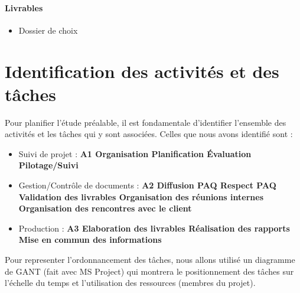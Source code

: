 \paragraph{Livrables}
\begin{itemize}
    \item Dossier de choix
\end{itemize}

\section{Identification des activités et des tâches}

Pour planifier l’étude préalable, il est fondamentale d’identifier l’ensemble des activités et les tâches qui y sont associées. Celles que nous avons identifié sont :
\begin{itemize}
    \item Suivi de projet : \bf{A1}
        \subitem Organisation
        \subitem Planification
        \subitem Évaluation
        \subitem Pilotage/Suivi

    \item Gestion/Contrôle de documents : \bf{A2}
        \subitem Diffusion PAQ
        \subitem Respect PAQ
        \subitem Validation des livrables
        \subitem Organisation des réunions internes
        \subitem Organisation des rencontres avec le client

    \item Production : \bf{A3}
        \subitem Elaboration des livrables
        \subitem Réalisation des rapports
        \subitem Mise en commun des informations
\end{itemize}

Pour representer l’ordonnancement des tâches, nous allons utilisé un diagramme de GANT (fait avec MS Project) qui montrera le positionnement des tâches sur l’échelle du temps et l’utilisation des ressources (membres du projet).


